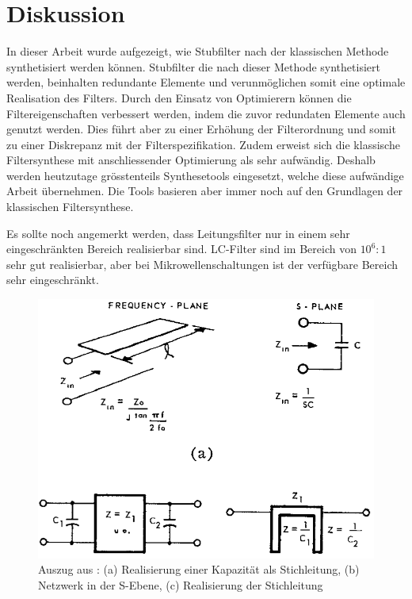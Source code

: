 \section{Diskussion}

In dieser Arbeit wurde aufgezeigt, wie Stubfilter nach der klassischen Methode
synthetisiert werden können. Stubfilter  die nach dieser Methode synthetisiert
werden, beinhalten redundante  Elemente und verunmöglichen somit eine optimale
Realisation  des  Filters.  Durch  den  Einsatz  von  Optimierern  können  die
Filtereigenschaften  verbessert werden, indem die  zuvor  redundaten  Elemente
auch genutzt  werden.  Dies führt aber zu einer Erhöhung der Filterordnung und
somit zu einer  Diskrepanz mit der Filterspezifikation. Zudem erweist sich die
klassische Filtersynthese mit anschliessender  Optimierung als sehr aufwändig.
Deshalb werden heutzutage grösstenteils Synthesetools eingesetzt, welche diese
aufwändige  Arbeit  übernehmen.  Die  Tools  basieren aber immer noch auf  den
Grundlagen der klassischen Filtersynthese.

Es  sollte  noch  angemerkt werden, dass  Leitungsfilter  nur  in  einem  sehr
eingeschr\"ankten Bereich realisierbar sind.  LC-Filter  sind  im  Bereich von
$10^6:1$  sehr gut  realisierbar,  aber  bei  Mikrowellenschaltungen  ist  der
verf\"ugbare Bereich sehr eingeschr\"ankt.

\begin{figure}[h!]
    \centering
    \includegraphics[width=\imagewidth]{images/bereich}
    \caption{Auszug aus \cite{ref:wenzel}: (a) Realisierung einer Kapazit\"at als Stichleitung, (b) Netzwerk in der S-Ebene, (c) Realisierung der Stichleitung}
    \label{fig:bereich}
\end{figure}

